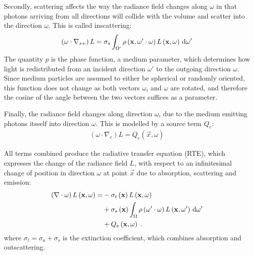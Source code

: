 Secondly, scattering affects the way the radiance field changes along $\omega$ in that photons arriving from all directions will collide with the volume and scatter into the direction $\omega$. This is called inscattering:
\begin{align}
\left(\omega\cdot\nabla_{s+}\right)L = \sigma_s \int_{\Omega'}\rho\left(\mathbf{x}, \omega'\cdot\omega\right)L\left(\mathbf{x}, \omega \right)\,\mathrm{d}\omega'
\label{eq:rte_inscattering}
\end{align}
The quantity $p$ is the phase function, a medium parameter, which determines how light is redistributed from an incident direction $\omega'$ to the outgoing direction $\omega$. Since medium particles are assumed to either be spherical or randomly oriented, this function does not change as both vectors $\omega_i$ and $\omega$ are rotated, and therefore the cosine of the angle between the two vectors suffices as a parameter.


Finally, the radiance field changes along direction $\omega$, due to the medium emitting photons itsself into direction $\omega$. This is modelled by a source term $Q_e$:
\begin{align}
\left(\omega\cdot\nabla_{e}\right)L = Q_e\left(\vec{x}, \omega\right)
\end{align}

All terms combined produce the radiative transfer equation (RTE), which expresses the change of the radiance field $L$, with respect to an infinitesimal change of position in direction $\omega$ at point $\vec{x}$ due to absorption, scattering and emission:
\begin{align}
\left(\nabla\cdot\omega\right)L\left(\mathbf{x}, \omega \right)
=&
-\sigma_t\left(\mathbf{x}\right) L\left(\mathbf{x}, \omega \right)\nonumber\\
&
+\sigma_s\left(\mathbf{x}\right) \int_{\Omega}
{
\rho\left(\omega'\cdot\omega\right)L\left(\mathbf{x}, \omega' \right)\,\mathrm{d}\omega'
}
\label{eq:rte}
\\
&
+Q_e\left(\mathbf{x}, \omega\right)
\nonumber
\  .
\end{align}
where $\sigma_t=\sigma_a+\sigma_s$ is the extinction coefficient, which combines absorption and outscattering.

